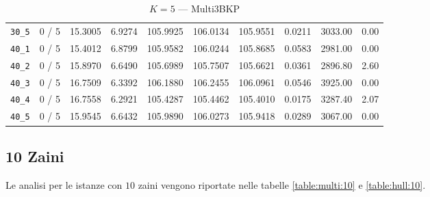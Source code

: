 \begin{table}[h!]
\begin{center}
\begin{tabular}{| c | c | c | c | c | c | c | c | c | c |}
\verb|30_5| & 0 / 5 & 15.3005 & 6.9274 & 105.9925 & 106.0134 & 105.9551 & 0.0211 & 3033.00 & 0.00\\ 
\verb|40_1| & 0 / 5 & 15.4012 & 6.8799 & 105.9582 & 106.0244 & 105.8685 & 0.0583 & 2981.00 & 0.00\\ 
\verb|40_2| & 0 / 5 & 15.8970 & 6.6490 & 105.6989 & 105.7507 & 105.6621 & 0.0361 & 2896.80 & 2.60\\ 
\verb|40_3| & 0 / 5 & 16.7509 & 6.3392 & 106.1880 & 106.2455 & 106.0961 & 0.0546 & 3925.00 & 0.00\\ 
\verb|40_4| & 0 / 5 & 16.7558 & 6.2921 & 105.4287 & 105.4462 & 105.4010 & 0.0175 & 3287.40 & 2.07\\ 
\verb|40_5| & 0 / 5 & 15.9545 & 6.6432 & 105.9890 & 106.0273 & 105.9418 & 0.0289 & 3067.00 & 0.00\\ 
\hline
\end{tabular}
\caption{$K = 5$ --- Multi3BKP}
\label{table:multi:5}
\end{center}
\end{table}

\subsection{10 Zaini}
Le analisi per le istanze con $10$ zaini vengono riportate nelle tabelle
\ref{table:multi:10} e \ref{table:hull:10}.

